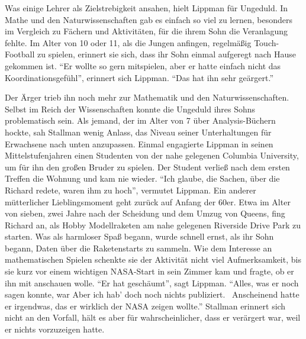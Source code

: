 Was einige Lehrer als Zielstrebigkeit ansahen, hielt Lippman für Ungeduld. In Mathe und den Naturwissenschaften gab es einfach so viel zu lernen, besonders im Vergleich zu Fächern und Aktivitäten, für die ihrem Sohn die Veranlagung fehlte. Im Alter von 10 oder 11, als die Jungen anfingen, regelmäßig Touch-Football zu spielen, erinnert sie sich, dass ihr Sohn einmal aufgeregt nach Hause gekommen ist. "`Er wollte so gern mitspielen, aber er hatte einfach nicht das Koordinationsgefühl"', erinnert sich Lippman. "`Das hat ihn sehr geärgert."'

Der Ärger trieb ihn noch mehr zur Mathematik und den Naturwissenschaften. Selbst im Reich der Wissenschaften konnte die Ungeduld ihres Sohns problematisch sein. Als jemand, der im Alter von 7 über Analysis-Büchern hockte, sah Stallman wenig Anlass, das Niveau seiner Unterhaltungen für Erwachsene nach unten anzupassen. Einmal engagierte Lippman in seinen Mittelstufenjahren einen Studenten von der nahe gelegenen Columbia University, um für ihn den großen Bruder zu spielen. Der Student verließ nach dem ersten Treffen die Wohnung und kam nie wieder. "`Ich glaube, die Sachen, über die Richard redete, waren ihm zu hoch"', vermutet Lippman.
Ein anderer mütterlicher Lieblingsmoment geht zurück auf Anfang der 60er. 
Etwa im Alter von sieben, zwei Jahre nach der Scheidung und dem Umzug von Queens, fing Richard an, als Hobby Modellraketen am nahe gelegenen Riverside Drive Park zu starten. Was als harmloser Spaß begann, wurde schnell ernst, als ihr Sohn begann, Daten über die Raketenstarts zu sammeln. Wie dem Interesse an mathematischen Spielen schenkte sie der Aktivität nicht viel Aufmerksamkeit, bis sie kurz vor einem wichtigen NASA-Start in sein Zimmer kam und fragte, ob er ihn mit anschauen wolle.
"`Er hat geschäumt"', sagt Lippman. "`Alles, was er noch sagen konnte, war \glq Aber ich hab' doch noch nichts publiziert.\grq ~ Anscheinend hatte er irgendwas, das er wirklich der NASA zeigen wollte."' Stallman erinnert sich nicht an den Vorfall, hält es aber für wahrscheinlicher, dass er verärgert war, weil er nichts vorzuzeigen hatte.

